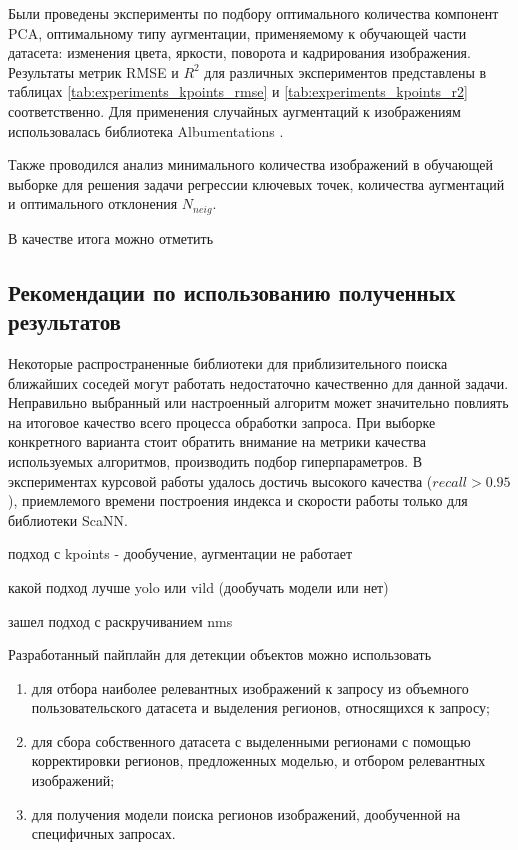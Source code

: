 \documentclass[a4paper,14pt]{article}
\begin{document}
    Были проведены эксперименты по подбору оптимального количества компонент PCA, оптимальному типу аугментации, применяемому к обучающей части датасета: изменения цвета, яркости, поворота и кадрирования изображения.
    Результаты метрик RMSE и $R^2$ для различных экспериментов представлены в таблицах \ref{tab:experiments_kpoints_rmse} и \ref{tab:experiments_kpoints_r2} соответственно. Для применения случайных аугментаций к изображениям использовалась библиотека Albumentations \cite{albumentations}.

    Также проводился анализ минимального количества изображений в обучающей выборке для решения задачи регрессии ключевых точек, количества аугментаций и оптимального отклонения $N_{neig}$.
    
    В качестве итога можно отметить %

    \subsection{Рекомендации по использованию полученных результатов}

    Некоторые распространенные библиотеки для приблизительного поиска ближайших соседей могут работать недостаточно качественно для данной задачи.
    Неправильно выбранный или настроенный алгоритм может значительно повлиять на итоговое качество всего процесса обработки запроса.
    При выборке конкретного варианта стоит обратить внимание на метрики качества используемых алгоритмов, производить подбор гиперпараметров.
    В экспериментах курсовой работы удалось достичь высокого качества ($recall > 0.95$), приемлемого времени построения индекса и скорости работы только для библиотеки ScaNN.

    подход с kpoints - дообучение, аугментации не работает

    какой подход лучше yolo или vild (дообучать модели или нет)

    зашел подход с раскручиванием nms

    Разработанный пайплайн для детекции объектов можно использовать 
        \begin{enumerate}
    	[1)]
    	\itemsep0em
    	\item для отбора наиболее релевантных изображений к запросу из объемного пользовательского датасета и выделения регионов, относящихся к запросу;
    	\item для сбора собственного датасета с выделенными регионами с помощью корректировки регионов, предложенных моделью, и отбором релевантных изображений;
    	\item для получения модели поиска регионов изображений, дообученной  на специфичных запросах.
    \end{enumerate}
\end{document}
